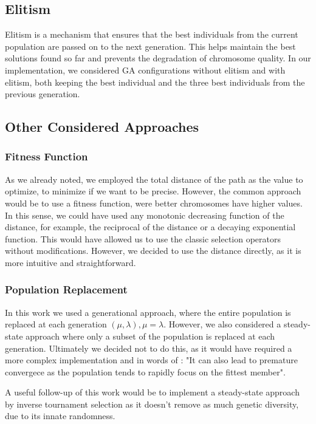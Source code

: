 \documentclass[12pt]{article}
\begin{document}
\begin{enumerate}
\subsection{Elitism}
Elitism is a mechanism that ensures that the best individuals from the current population are passed on to the next generation. This helps maintain the best solutions found so far and prevents the degradation of chromosome quality. In our implementation, we considered GA configurations without elitism and with elitism, both keeping the best individual and the three best individuals from the previous generation.

\subsection{Other Considered Approaches}
\subsubsection{Fitness Function}
As we already noted, we employed the total distance of the path as the value to optimize, to minimize if we want to be precise. However, the common approach would be to use a fitness function, were better chromosomes have higher values. In this sense, we could have used any monotonic decreasing function of the distance, for example, the reciprocal of the distance or a decaying exponential function. This would have allowed us to use the classic selection operators without modifications. However, we decided to use the distance directly, as it is more intuitive and straightforward.

\subsubsection{Population Replacement}
In this work we used a generational approach, where the entire population is replaced at each generation $(\mu,\lambda), \mu=\lambda$. However, we also considered a steady-state approach where only a subset of the population is replaced at each generation. Ultimately we decided not to do this, as it would have required a more complex implementation and in words of \cite{Eiben2003}: "It can also lead to premature convergece as the population tends to rapidly focus on the fittest member". 

A useful follow-up of this work would be to implement a steady-state approach by inverse tournament selection as it doesn't remove as much genetic diversity, due to its innate randomness.


\end{enumerate}
\end{document}
